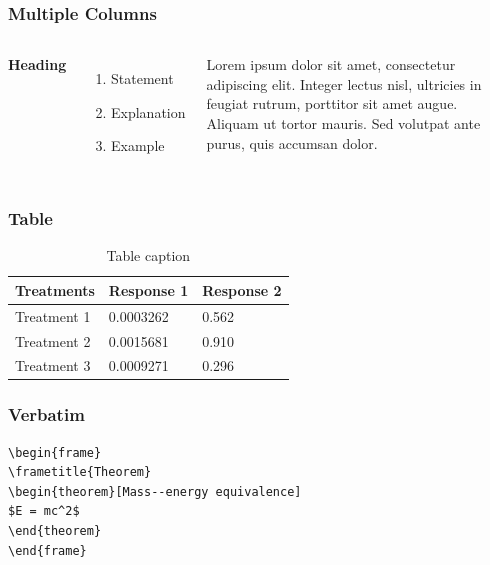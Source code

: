 \documentclass{beamer}
\begin{document}
%

\begin{frame}
\frametitle{Multiple Columns}
\begin{columns}[c] %

\textbf{Heading}
\begin{enumerate}
\item Statement
\item Explanation
\item Example
\end{enumerate}

Lorem ipsum dolor sit amet, consectetur adipiscing elit. Integer lectus nisl, ultricies in feugiat rutrum, porttitor sit amet augue. Aliquam ut tortor mauris. Sed volutpat ante purus, quis accumsan dolor.

\end{columns}
\end{frame}


\begin{frame}
\frametitle{Table}
\begin{table}
\begin{tabular}{l l l}
\toprule
\textbf{Treatments} & \textbf{Response 1} & \textbf{Response 2}\\
\midrule
Treatment 1 & 0.0003262 & 0.562 \\
Treatment 2 & 0.0015681 & 0.910 \\
Treatment 3 & 0.0009271 & 0.296 \\
\bottomrule
\end{tabular}
\caption{Table caption}
\end{table}
\end{frame}


\begin{frame}[fragile] %
\frametitle{Verbatim}
\begin{example}
\begin{verbatim}
\begin{frame}
\frametitle{Theorem}
\begin{theorem}[Mass--energy equivalence]
$E = mc^2$
\end{theorem}
\end{frame}\end{verbatim}
\end{example}
\end{frame}
\end{document}
